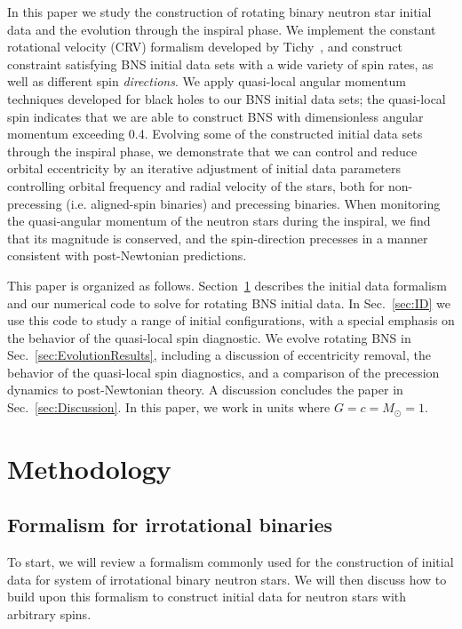 {In this paper we study the construction of rotating binary neutron
star initial data and the evolution through the inspiral phase.  We
implement the constant rotational velocity (CRV) formalism developed
by Tichy~\cite{Tichy:2012rp}, and construct constraint satisfying BNS
initial data sets with a wide variety of spin rates, as well as different spin
\emph{directions}.  We apply quasi-local angular momentum techniques
developed for black holes to our BNS initial data sets; the
quasi-local spin indicates that we are able to construct BNS with
dimensionless angular momentum exceeding 0.4.  Evolving some of the
constructed initial data sets through the inspiral phase, we
demonstrate that we can control and reduce orbital eccentricity by an
iterative adjustment of initial data parameters controlling orbital
frequency and radial velocity of the stars, both for non-precessing
(i.e. aligned-spin binaries) and precessing binaries.  When monitoring
the quasi-angular momentum of the neutron stars during the inspiral,
we find that its magnitude is conserved, and the spin-direction
precesses in a manner consistent with post-Newtonian predictions.

This paper is organized as follows.  Section~\ref{sec:Methodology}
describes the initial data formalism and our numerical code to solve
for rotating BNS initial data.  In Sec.~\ref{sec:ID} we use this
code to study a range of initial configurations, 
with a special emphasis on the behavior of
the quasi-local spin diagnostic.  We evolve rotating BNS in
Sec.~\ref{sec:EvolutionResults}, including a discussion of
eccentricity removal, the behavior of the quasi-local spin
diagnostics, and a comparison of the precession dynamics to
post-Newtonian theory.  A discussion concludes the paper in
Sec.~\ref{sec:Discussion}. In this paper,  we work in units where $G=c=M_{\odot}=1$.

\section{Methodology}
\label{sec:Methodology}

\subsection{Formalism for irrotational binaries}
\label{sec:IrrotFormalism}

To start, we will review a formalism commonly used for the 
construction of initial data for system of irrotational binary neutron stars. 
We will then discuss how to
build upon this formalism to construct initial data for neutron stars
with arbitrary spins.

}
